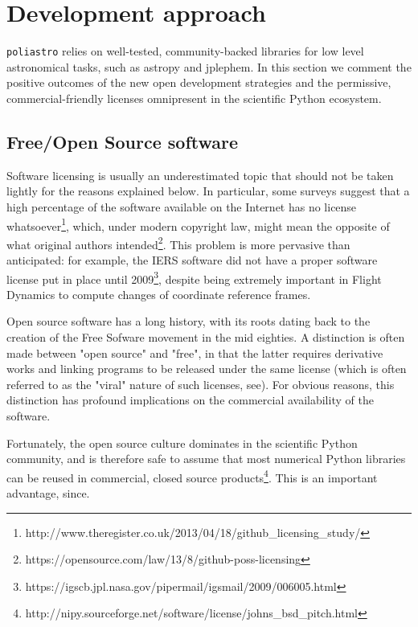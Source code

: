 \section{Development approach}
\label{sec:development}

\verb|poliastro| relies on well-tested, community-backed libraries for low level astronomical tasks, such as astropy\cite{Robitaille2013} and jplephem. In this section we comment the positive outcomes of the new open development strategies and the permissive, commercial-friendly licenses omnipresent in the scientific Python ecosystem.

\subsection{Free/Open Source software}

Software licensing is usually an underestimated topic that should not be taken lightly for the reasons explained below. In particular, some surveys suggest that a high percentage of the software available on the Internet has no license whatsoever\footnote{http://www.theregister.co.uk/2013/04/18/github\_licensing\_study/}, which, under modern copyright law, might mean the opposite of what original authors intended\footnote{https://opensource.com/law/13/8/github-poss-licensing}. This problem is more pervasive than anticipated: for example, the IERS software did not have a proper software license put in place until 2009\footnote{https://igscb.jpl.nasa.gov/pipermail/igsmail/2009/006005.html}, despite being extremely important in Flight Dynamics to compute changes of coordinate reference frames.

Open source software has a long history, with its roots dating back to the creation of the Free Sofware movement in the mid eighties\cite{Stallman:1985:GM}. A distinction is often made between "open source" and "free", in that the latter requires derivative works and linking programs to be released under the same license (which is often referred to as the "viral" nature of such licenses, see\cite{stallman2009viewpoint}). For obvious reasons, this distinction has profound implications on the commercial availability of the software.

Fortunately, the open source culture dominates in the scientific Python community, and is therefore safe to assume that most numerical Python libraries can be reused in commercial, closed source products\footnote{http://nipy.sourceforge.net/software/license/johns\_bsd\_pitch.html}. This is an important advantage, since.

